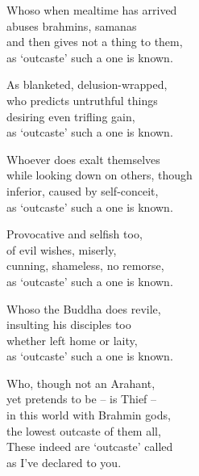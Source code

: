\begin{MyDescription}{}
Whoso when mealtime has arrived\\
abuses brahmins, samanas\\
and then gives not a thing to them,\\
as `outcaste' such a one is known.
\end{MyDescription}   

\begin{MyDescription}{}
As blanketed, delusion-wrapped,\\
who predicts untruthful things\\
desiring even trifling gain,\\
as `outcaste' such a one is known.
\end{MyDescription}  

\begin{MyDescription}{}
Whoever does exalt themselves\\
while looking down on others, though\\
inferior, caused by self-conceit,\\
as `outcaste' such a one is known.
\end{MyDescription}      
   
\begin{MyDescription}{}
Provocative and selfish too,\\
of evil wishes, miserly,\\
cunning, shameless, no remorse,\\
as `outcaste' such a one is known.
\end{MyDescription}      

\begin{MyDescription}{}
Whoso the Buddha does revile,\\
insulting his disciples too\\
whether left home or laity,\\
as `outcaste' such a one is known.
\end{MyDescription}      

\begin{MyDescription}{}
Who, though not an Arahant,\\
yet pretends to be – is Thief –\\
in this world with Brahmin gods,\\
the lowest outcaste of them all,\\
These indeed are `outcaste' called\\
as I've declared to you.
\end{MyDescription}      

